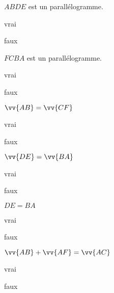 \begin{QCM}
\begin{GroupeQCM}
\begin{exercice}$ABDE$ est un parallélogramme.
\begin{ChoixQCM}{2}
\item vrai
\item faux
\end{ChoixQCM}
\begin{corrige}
\end{corrige}
\end{exercice}

\begin{exercice}$FCBA$ est un parallélogramme.
\begin{ChoixQCM}{2}
\item vrai
\item faux
\end{ChoixQCM}
\begin{corrige}
\end{corrige}
\end{exercice}


\begin{exercice}$\vv{AB}=\vv{CF}$
\begin{ChoixQCM}{2}
\item vrai
\item faux
\end{ChoixQCM}
\begin{corrige}
\end{corrige}
\end{exercice}

\begin{exercice}$\vv{DE}=\vv{BA}$
\begin{ChoixQCM}{2}
\item vrai
\item faux
\end{ChoixQCM}
\begin{corrige}
\end{corrige}
\end{exercice}

\begin{exercice}$DE=BA$
\begin{ChoixQCM}{2}
\item vrai
\item faux
\end{ChoixQCM}
\begin{corrige}
\end{corrige}
\end{exercice}

\begin{exercice}$\vv{AB}+\vv{AF}=\vv{AC}$
\begin{ChoixQCM}{2}
\item vrai
\item faux
\end{ChoixQCM}
\begin{corrige}
\end{corrige}
\end{exercice}


\end{GroupeQCM}
\end{QCM}
